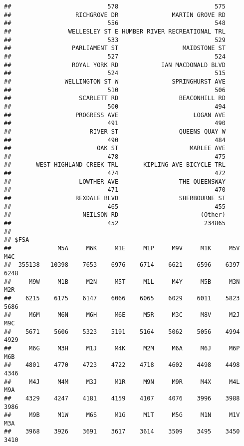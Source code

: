 \documentclass[]{article}
\begin{document}
\begin{verbatim}
##                           578                           575 
##                  RICHGROVE DR               MARTIN GROVE RD 
##                           556                           548 
##                WELLESLEY ST E HUMBER RIVER RECREATIONAL TRL 
##                           533                           529 
##                 PARLIAMENT ST                  MAIDSTONE ST 
##                           527                           524 
##                 ROYAL YORK RD            IAN MACDONALD BLVD 
##                           524                           515 
##               WELLINGTON ST W               SPRINGHURST AVE 
##                           510                           506 
##                   SCARLETT RD                 BEACONHILL RD 
##                           500                           494 
##                  PROGRESS AVE                     LOGAN AVE 
##                           491                           490 
##                      RIVER ST                 QUEENS QUAY W 
##                           490                           484 
##                        OAK ST                    MARLEE AVE 
##                           478                           475 
##       WEST HIGHLAND CREEK TRL       KIPLING AVE BICYCLE TRL 
##                           474                           472 
##                   LOWTHER AVE                 THE QUEENSWAY 
##                           471                           470 
##                  REXDALE BLVD                 SHERBOURNE ST 
##                           465                           455 
##                    NEILSON RD                       (Other) 
##                           452                        234865 
## 
## $FSA
##             M5A     M6K     M1E     M1P     M9V     M1K     M5V     M4C 
##  355138   10398    7653    6976    6714    6621    6596    6397    6248 
##     M9W     M1B     M2N     M5T     M1L     M4Y     M5B     M3N     M2R 
##    6215    6175    6147    6066    6065    6029    6011    5823    5686 
##     M6M     M6N     M6H     M6E     M5R     M3C     M8V     M2J     M9C 
##    5671    5606    5323    5191    5164    5062    5056    4994    4929 
##     M6G     M3H     M1J     M4K     M2M     M6A     M6J     M6P     M6B 
##    4801    4770    4723    4722    4718    4602    4498    4498    4346 
##     M4J     M4M     M3J     M1R     M9N     M9R     M4X     M4L     M9A 
##    4329    4247    4181    4159    4107    4076    3996    3988    3986 
##     M9B     M1W     M6S     M1G     M1T     M5G     M1N     M1V     M3A 
##    3968    3926    3691    3617    3614    3509    3495    3450    3410 

\end{verbatim}
\end{document}
